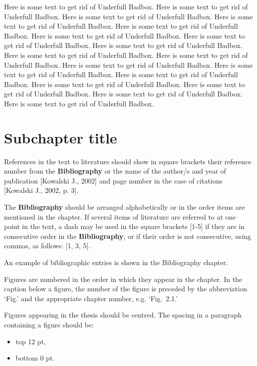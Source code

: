 Here is some text to get rid of Underfull Badbox. Here is some text to get rid of Underfull Badbox. Here is some text to get rid of Underfull Badbox. Here is some text to get rid of Underfull Badbox. Here is some text to get rid of Underfull Badbox. Here is some text to get rid of Underfull Badbox. Here is some text to get rid of Underfull Badbox. Here is some text to get rid of Underfull Badbox. Here is some text to get rid of Underfull Badbox. Here is some text to get rid of Underfull Badbox. Here is some text to get rid of Underfull Badbox. Here is some text to get rid of Underfull Badbox. Here is some text to get rid of Underfull Badbox. Here is some text to get rid of Underfull Badbox. Here is some text to get rid of Underfull Badbox. Here is some text to get rid of Underfull Badbox. Here is some text to get rid of Underfull Badbox.



\section{Subchapter title}

References in the text to literature should show in square brackets their reference number from the \textbf{Bibliography} or the name of the author/s and year of publication [Kowalski J., 2002] and page number in the case of citations [Kowalski J., 2002, p. 3].

The \textbf{Bibliography} should be arranged alphabetically or in the order items are mentioned in the chapter. If several items of literature are referred to at one point in the text, a dash may be used in the square brackets [1-5] if they are in consecutive order in the \textbf{Bibliography}, or if their order is not consecutive, using commas, as follows: [1, 3, 5].

An example of bibliographic entries is shown in the Bibliography chapter.

Figures are numbered in the order in which they appear in the chapter. In the caption below a figure, the number of the figure is preceded by the abbreviation ‘Fig.’ and the appropriate chapter number, e.g. ‘Fig.~2.1.’

Figures appearing in the thesis should be centred. The spacing in a paragraph containing a figure should be:
\begin{itemize}
	\item top 12 pt,
	\item bottom 0 pt.
\end{itemize}

